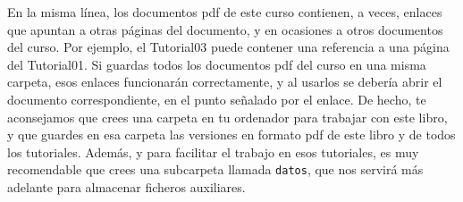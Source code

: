 En la misma línea, los documentos pdf de este curso contienen, a veces, enlaces que apuntan a otras páginas del documento, y en ocasiones a otros documentos del curso. Por ejemplo, el Tutorial03 puede contener una referencia a una página del Tutorial01. Si guardas todos los documentos pdf del curso en una misma carpeta, esos enlaces funcionarán correctamente, y al usarlos se debería abrir el documento correspondiente, en el punto señalado por el enlace. De hecho, te aconsejamos que crees una carpeta en tu ordenador para trabajar con este libro, y que guardes en esa carpeta las versiones en formato pdf de este libro y de todos los tutoriales. Además, y para facilitar el trabajo en esos tutoriales, es muy recomendable que crees una subcarpeta llamada {\tt datos}, que nos servirá más adelante para almacenar ficheros auxiliares.

